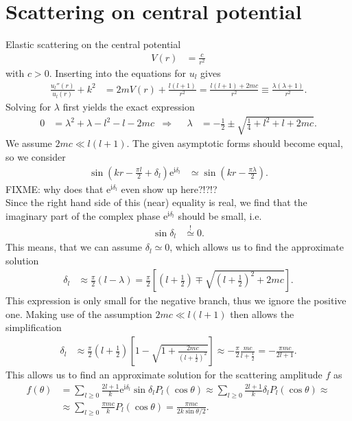 \documentclass[english, parskip=full]{scrartcl}
\newcommand{\kla}{}
\newcommand{\klam}{}
\def\I{\text{i}}
\def\e{\text{e}}
\begin{document}
\section{Scattering on central potential}
Elastic scattering on the central potential
\begin{align}
V(r)&=\frac{c}{r^2}
\end{align}
with $c> 0$.
Inserting into the equations for $u_l$ gives
\begin{align}
\frac{u_l''(r)}{u_l(r)}+k^2&=2mV(r)+\frac{l(l+1)}{r^2}=\frac{l(l+1)+2mc}{r^2}\equiv\frac{\lambda (\lambda +1)}{r^2}.
\end{align}
Solving for $\lambda$ first yields the exact expression
\begin{align}
0&=\lambda^2+\lambda-l^2-l-2mc&\Rightarrow &&\lambda&=-\frac{1}{2}\pm\sqrt{\frac{1}{4}+l^2+l+2mc}.
\end{align}
We assume $2mc\ll l(l+1)$.
The given asymptotic forms should become equal, so we consider 
\begin{align}
\sin\kla\left( {kr-\frac{\pi l}{2}+\delta_l} \right)\e^{\I\delta_l}&\simeq\sin\kla\left( {kr-\frac{\pi\lambda}{2}} \right).
\end{align}
FIXME: why does that $\e^{\I\delta_l}$ even show up here?!?!?
\\
Since the right hand side of this (near) equality is real, we find that the imaginary part of the complex phase $\e^{\I\delta_l}$ should be small, i.e.
\begin{align}
\sin\delta_l&\overset{!}{\simeq}0.
\end{align}
This means, that we can assume $\delta_l\simeq 0$, which allows us to find the approximate solution
\begin{align}
\delta_l&\approx\frac{\pi}{2}\kla\left( {l-\lambda} \right)=\frac{\pi}{2}\klam\left[ {\kla\left( {l+\frac{1}{2}} \right)\mp\sqrt{\kla\left( {l+\frac{1}{2}} \right)^2+2mc}} \right].
\end{align}
This expression is only small for the negative branch, thus we ignore the positive one.
Making use of the assumption $2mc\ll l(l+1)$ then allows the simplification
\begin{align}
\delta_l&\approx\frac{\pi}{2}\kla\left( {l+\frac{1}{2}} \right)\klam\left[ {1-\sqrt{1+\frac{2mc}{\kla\left( {l+\frac{1}{2}} \right)^2}}} \right]\approx-\frac{\pi}{2}\frac{mc}{l+\frac{1}{2}}=-\frac{\pi mc}{2l+1}.
\end{align}
This allows us to find an approximate solution for the scattering amplitude $f$ as
\begin{align}
f(\theta)&=\sum_{l\ge 0}\frac{2l+1}{k}\e^{\I\delta_l}\sin\delta_lP_l(\cos\theta)\approx\sum_{l\ge 0}\frac{2l+1}{k}\delta_lP_l(\cos\theta)\approx\\
&\approx\sum_{l\ge 0}\frac{\pi mc}{k}P_l(\cos\theta)=\frac{\pi mc}{2k\sin\theta/2}.
\end{align}
\newpage
\end{document}
